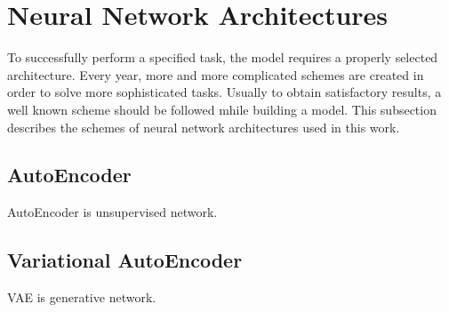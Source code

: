 \section{Neural Network Architectures}
To successfully perform a specified task, the model requires a properly selected architecture. Every year, more and more complicated schemes are created in order to solve more sophisticated tasks. Usually to obtain satisfactory results, a well known scheme should be followed mhile building a model. This subsection describes the schemes of neural network architectures used in this work.


\subsection{AutoEncoder}
AutoEncoder is unsupervised network.

\subsection{Variational AutoEncoder}
VAE is generative network.
